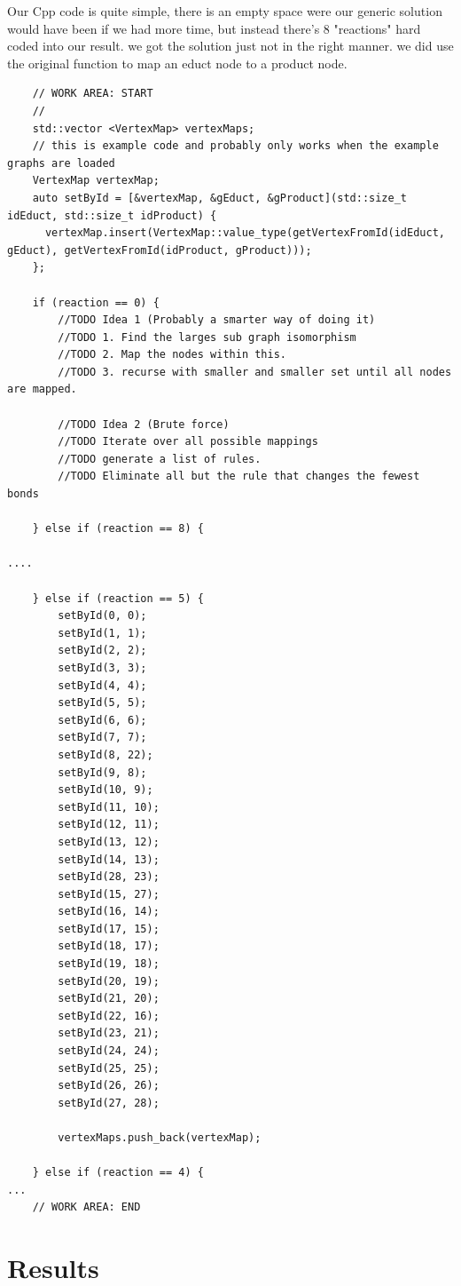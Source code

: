 \documentclass[a4paper,10pt,titlepage]{report}
\begin{document}
Our Cpp code is quite simple, there is an empty space were our generic solution would have been if we had more time, but instead there's 8 "reactions" hard coded into our result. we got the solution just not in the right manner. we did use the original function to map an educt node to a product node.
\begin{lstlisting}
    // WORK AREA: START
    //
    std::vector <VertexMap> vertexMaps;
    // this is example code and probably only works when the example graphs are loaded
    VertexMap vertexMap;
    auto setById = [&vertexMap, &gEduct, &gProduct](std::size_t idEduct, std::size_t idProduct) {
      vertexMap.insert(VertexMap::value_type(getVertexFromId(idEduct, gEduct), getVertexFromId(idProduct, gProduct)));
    };

    if (reaction == 0) {
        //TODO Idea 1 (Probably a smarter way of doing it)
        //TODO 1. Find the larges sub graph isomorphism
        //TODO 2. Map the nodes within this.
        //TODO 3. recurse with smaller and smaller set until all nodes are mapped.

        //TODO Idea 2 (Brute force)
        //TODO Iterate over all possible mappings
        //TODO generate a list of rules.
        //TODO Eliminate all but the rule that changes the fewest bonds

    } else if (reaction == 8) {

....

    } else if (reaction == 5) {
        setById(0, 0);
        setById(1, 1);
        setById(2, 2);
        setById(3, 3);
        setById(4, 4);
        setById(5, 5);
        setById(6, 6);
        setById(7, 7);
        setById(8, 22);
        setById(9, 8);
        setById(10, 9);
        setById(11, 10);
        setById(12, 11);
        setById(13, 12);
        setById(14, 13);
        setById(28, 23);
        setById(15, 27);
        setById(16, 14);
        setById(17, 15);
        setById(18, 17);
        setById(19, 18);
        setById(20, 19);
        setById(21, 20);
        setById(22, 16);
        setById(23, 21);
        setById(24, 24);
        setById(25, 25);
        setById(26, 26);
        setById(27, 28);

        vertexMaps.push_back(vertexMap);

    } else if (reaction == 4) {
...
    // WORK AREA: END

\end{lstlisting}


\section {Results}
\end{document}
